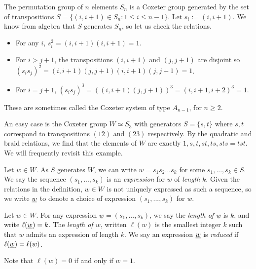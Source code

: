 \n\begin{example}\label{example-CG}
    The permutation group of $n$ elements $S_n$ is a Coxeter group generated by the set of transpositions $S = \{(i,i+1) \in S_n : 1 \leq i \leq n-1\}$. Let $s_i := (i,i+1)$. We know from algebra that $S$ generates $S_n$, so let us check the relations.
    \begin{itemize}
        \item For any $i$, $s_i^2 = (i,i+1)(i,i+1) = 1$.
        \item For $i > j+1$, the transpositions $(i,i+1)$ and $(j,j+1)$ are disjoint so $(s_i s_j)^2 = (i,i+1)(j,j+1)(i,i+1)(j,j+1) = 1$.
        \item For $i = j+1$, $(s_i s_j)^3 = ((i,i+1)(j,j+1))^3 = (i,i+1,i+2)^3 = 1$.
    \end{itemize}
    These are sometimes called the Coxeter system of type $A_{n-1}$, for $n \geq 2$.

    \n
    An easy case is the Coxeter group $W \simeq S_3$ with generators $S = \{s,t\}$ where $s,t$ correspond to transpositions $(12)$ and $(23)$ respectively. By the quadratic and braid relations, we find that the elements of $W$ are exactly $1,s,t,st,ts,sts=tst$. We will frequently revisit this example. %

\end{example}

\begin{definition}
    Let $w \in W$. As $S$ generates $W$, we can write $w = s_1 s_2 ... s_k$ for some $s_1,...,s_k \in S$. We say the sequence $(s_1, ..., s_k)$ is an \textit{expression} for $w$ of \textit{length} $k$. Given the relations in the definition, $w \in W$ is not uniquely expressed as such a sequence, so we write $\underline{w}$ to denote a choice of expression $(s_1, ..., s_k)$ for $w$.
\end{definition}

\begin{definition}
    Let $w \in W$. For any expression $\underline{w} = (s_1, ..., s_k)$, we say the \textit{length of $\underline{w}$} is $k$, and write $\ell(\underline{w}) = k$. The \textit{length of $w$}, written $\ell(w)$ is the smallest integer $k$ such that $w$ admits an expression of length $k$. We say an expression $\underline{w}$ is \textit{reduced} if $\ell(\underline{w}) = \ell(w)$.
\end{definition}

Note that $\ell(w) = 0$ if and only if $w = 1$.


